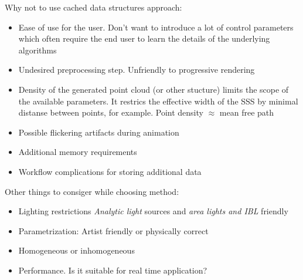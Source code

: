 Why not to use cached data structures approach:
\begin{itemize}
    \item{Ease of use for the user. Don't want to introduce a lot of control
    parameters which often require the end user to learn the details of the
    underlying algorithms}
    \item{Undesired preprocessing step. Unfriendly to progressive rendering}
    \item{Density of the generated point cloud (or other stucture) limits the
    scope of the available parameters. It restrics the effective width of the
    SSS by minimal distanse between points, for example. Point density $\approx$
    mean free path}
    \item{Possible flickering artifacts during animation}
    \item{Additional memory requirements}
    \item{Workflow complications for storing additional data}
\end{itemize}

Other things to consiger while choosing method:
\begin{itemize}
  \item Lighting restrictions \emph{Analytic light} sources and \emph{area lights and IBL} friendly
  \item Parametrization: Artist friendly or physically correct
  \item Homogeneous or inhomogeneous
  \item Performance. Is it suitable for real time application?
\end{itemize}